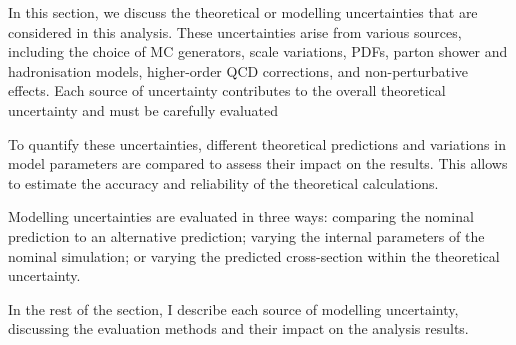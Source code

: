 In this section, we discuss the theoretical or modelling uncertainties that are considered in this analysis. 
These uncertainties arise from various sources, including the choice of MC generators, scale variations, 
PDFs, parton shower and hadronisation models, higher-order QCD corrections, and non-perturbative 
effects. Each source of uncertainty contributes to the overall theoretical uncertainty and must be 
carefully evaluated

To quantify these uncertainties, different theoretical predictions and variations in model parameters are 
compared to assess their impact on the results. This allows to estimate the accuracy and reliability of 
the theoretical calculations.

Modelling uncertainties are evaluated in three ways: 
comparing the nominal prediction to an alternative prediction; 
varying the internal parameters of the nominal simulation; 
or varying the predicted cross-section within the theoretical uncertainty.

In the rest of the section, I describe each source of modelling uncertainty, discussing the 
evaluation methods and their impact on the analysis results. 



